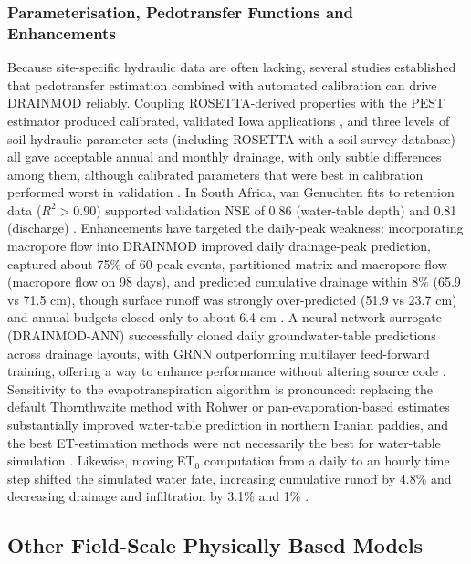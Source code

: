 \subsubsection{Parameterisation, Pedotransfer Functions and Enhancements}

Because site-specific hydraulic data are often lacking, several studies established that pedotransfer estimation combined with automated calibration can drive \textsc{DRAINMOD} reliably. Coupling ROSETTA-derived properties with the PEST estimator produced calibrated, validated Iowa applications \parencite{Singh2006b}, and three levels of soil hydraulic parameter sets (including ROSETTA with a soil survey database) all gave acceptable annual and monthly drainage, with only subtle differences among them, although calibrated parameters that were best in calibration performed worst in validation \parencite{Qi2015}. In South Africa, van Genuchten fits to retention data ($R^2>0.90$) supported validation NSE of 0.86 (water-table depth) and 0.81 (discharge) \parencite{Malota2024,Malota2015}. Enhancements have targeted the daily-peak weakness: incorporating macropore flow into \textsc{DRAINMOD} improved daily drainage-peak prediction, captured about 75\% of 60 peak events, partitioned matrix and macropore flow (macropore flow on 98 days), and predicted cumulative drainage within 8\% (65.9 vs 71.5 cm), though surface runoff was strongly over-predicted (51.9 vs 23.7 cm) and annual budgets closed only to about 6.4 cm \parencite{Askar2020}. A neural-network surrogate (\textsc{DRAINMOD-ANN}) successfully cloned daily groundwater-table predictions across drainage layouts, with GRNN outperforming multilayer feed-forward training, offering a way to enhance performance without altering source code \parencite{Awad2022,Awad2022b}. Sensitivity to the evapotranspiration algorithm is pronounced: replacing the default Thornthwaite method with Rohwer or pan-evaporation-based estimates substantially improved water-table prediction in northern Iranian paddies, and the best ET-estimation methods were not necessarily the best for water-table simulation \parencite{Malakshahi2020}. Likewise, moving ET$_0$ computation from a daily to an hourly time step shifted the simulated water fate, increasing cumulative runoff by 4.8\% and decreasing drainage and infiltration by 3.1\% and 1\% \parencite{Awad2022b}.

\subsection{Other Field-Scale Physically Based Models}

